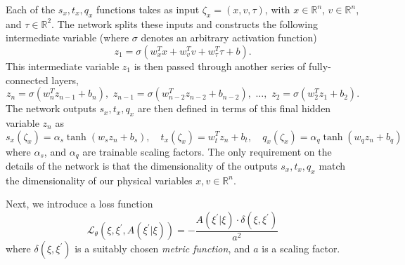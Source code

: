 \documentclass{article} %
\begin{document}
{Each of the \(s_{x}, t_{x}, q_{x}\) functions takes as input \(\zeta_{x} = (x, v, \tau)\), with \(x\in\mathbb{R}^{n}\),
\(v\in\mathbb{R}^{n}\), and \(\tau \in \mathbb{R}^{2}\).
%
The network splits these inputs and constructs the following intermediate variable (where \(\sigma\) denotes an
arbitrary activation function)
%
\begin{equation}
   z_{1} = \sigma(w_{x}^{T}x + w_{v}^{T}v + w_{\tau}^{T}\tau + b).
\end{equation}
%
This intermediate variable \(z_{1}\) is then passed through another series of fully-connected layers,
%
\begin{equation}
   z_{n} = \sigma(w_{n}^{T} z_{n-1} + b_{n}),\,\, z_{n-1}=\sigma(w_{n-2}^{T}z_{n-2} + b_{n-2}),\,\,%
   \ldots,\,\, z_{2} = \sigma(w_{2}^{T} z_{1} + b_{2}).
\end{equation}
%
The network outputs \(s_{x}, t_{x}, q_{x}\) are then defined in terms of this final hidden variable \(z_{n}\) as
%
\begin{equation}
   s_{x}(\zeta_{x}) = \alpha_{s}\tanh(w_{s}z_{n} + b_{s}),\quad
   t_{x}(\zeta_{x}) = w_{t}^{T}z_{n} + b_{t},\quad
   q_{x}(\zeta_{x}) = \alpha_{q}\tanh(w_{q}z_{n} + b_{q})
\end{equation}
%
where \(\alpha_{s}\), and \(\alpha_{q}\) are trainable scaling factors.
%
The only requirement on the details of the network is that the dimensionality of the outputs \(s_{x}, t_{x}, q_{x}\)
match the dimensionality of our physical variables \(x, v \in\mathbb{R}^{n}\).
%

Next, we introduce a loss function
%
\begin{equation}
   \mathcal{L}_{\theta}{\left(\xi, \xi^{\prime}, A(\xi^{\prime}|\xi)\right)}
      = -\frac{A(\xi^{\prime}|\xi)\cdot \delta(\xi, \xi^{\prime})}{a^{2}}
\end{equation}
%
where \(\delta(\xi, \xi^{\prime})\) is a suitably chosen \emph{metric function}, and \(a\) is a scaling factor.
%
}
\end{document}
